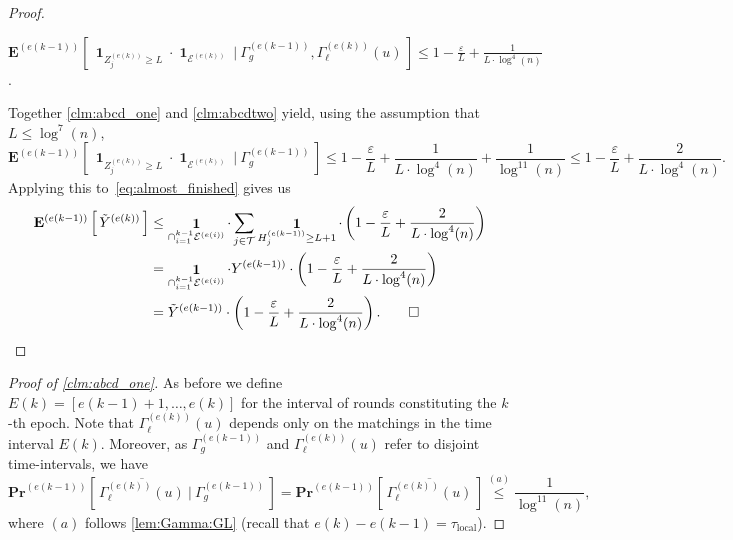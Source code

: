 \documentclass[twoside,leqno]{article}
\newcommand{\Exf}[2]{\mathbf{E}^{(#1)}\left[\,#2\,\right]}
\newcommand{\Prof}[2]{\mathbf{Pr}^{(#1)}\left[\,#2\,\right]}
\DeclareMathOperator{\1}{\mathbf{1}}
\newcommand{\taulocal}{\tau_{\mathrm{local}}}
\numberwithin{equation}{section}
\let\epsilon\varepsilon
\newcommand{\newL}{L}
\begin{document}
\begin{proof}
\begin{claim}
\label{clm:abcdtwo}
$\displaystyle\Exf{e(k-1)}{ \1_{Z_{j}^{(e(k))}\ge \newL} \cdot
\1_{\mathcal{E}^{(e(k))}} ~\Big|~  \Gamma_g^{(e(k-1))}, \Gamma_{\ell}^{(e(k))}(u) }
\leq
1 - \frac{\epsilon}{\newL} + \frac{1}{\newL \cdot \log^4 (n)}
$.
\end{claim}

Together \cref{clm:abcd_one} and \cref{clm:abcdtwo} yield, using the assumption that $L \leq \log^7(n)$,
\[
\Exf{e(k-1)}{ \1_{Z_{j}^{(e(k))}\ge \newL} \cdot
\1_{\mathcal{E}^{(e(k))}} ~\Big|~  \Gamma_g^{(e(k-1))} }
\leq
1 - \frac{\epsilon}{\newL} + \frac{1}{\newL \cdot \log^4 (n)} + \frac{1}{\log^{11} (n)}
\leq 1 - \frac{\epsilon}{\newL} + \frac{2}{\newL \cdot \log^4 (n)}.
\]
Applying this to~\cref{eq:almost_finished} gives us
\begin{align*}
\Exf{e(k-1)}{ \tilde{Y}^{(e(k))}   } &\leq \1_{\cap_{i=1}^{k-1} \mathcal{E}^{(e(i))}} \cdot \sum_{j\in \mathcal{T}} \1_{H_j^{(e(k-1))} \geq \newL+1} \cdot \left( 1 - \frac{\epsilon}{\newL} + \frac{2}{\newL \cdot \log^4 (n)} \right) \notag\\
&= \1_{\cap_{i=1}^{k-1} \mathcal{E}^{(e(i))}} \cdot Y^{(e(k-1))} \cdot \left( 1 - \frac{\epsilon}{\newL} + \frac{2}{\newL \cdot \log^4 (n)} \right)
\\& = \tilde{Y}^{(e(k-1))}\cdot \left( 1 - \frac{\epsilon}{\newL} + \frac{2}{\newL \cdot \log^4 (n)} \right). \qed
\end{align*}
\end{proof}




\begin{proof}[Proof of \cref{clm:abcd_one}]
As before we define $E(k)=[e(k-1)+1,\ldots,e(k)]$ for the interval of rounds constituting the $k$-th epoch.
Note that
$\Gamma_{\ell}^{(e(k))}(u)$ depends only on the matchings in the time interval $E(k)$. Moreover, as $\Gamma_g^{(e(k-1))}$ and $\Gamma_{\ell}^{(e(k))}(u)$ refer to disjoint time-intervals, we have 
\[
\Prof{e(k-1)}{\overline{\Gamma_{\ell}^{(e(k))}(u)} ~\Big|~ \Gamma_g^{(e(k-1))} } = \Prof{e(k-1)}{\overline{\Gamma_{\ell}^{(e(k))}(u)}} \stackrel{(a)}{\leq} \frac{1}{\log^{11}(n)},
\]
where $(a)$ follows \cref{lem:Gamma:GL}
(recall that $e(k)-e(k-1)=\taulocal$).
\end{proof}
\end{document}
